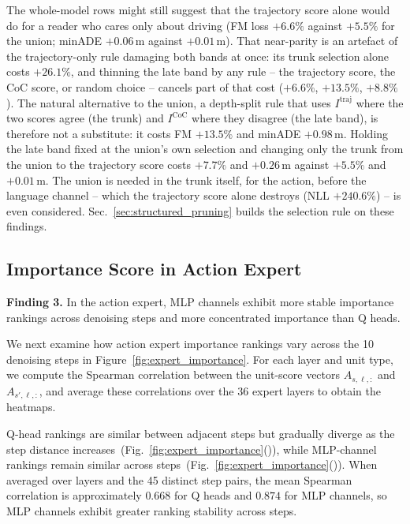 The whole-model rows might still suggest that the trajectory score alone would do for a reader who cares only about driving (FM loss $+6.6\%$ against $+5.5\%$ for the union; minADE $+0.06$\,m against $+0.01$\,m). That near-parity is an artefact of the trajectory-only rule damaging both bands at once: its trunk selection alone costs $+26.1\%$, and thinning the late band by any rule -- the trajectory score, the CoC score, or random choice -- cancels part of that cost ($+6.6\%$, $+13.5\%$, $+8.8\%$). The natural alternative to the union, a depth-split rule that uses $I^{\mathrm{traj}}$ where the two scores agree (the trunk) and $I^{\mathrm{CoC}}$ where they disagree (the late band), is therefore not a substitute: it costs FM $+13.5\%$ and minADE $+0.98$\,m. Holding the late band fixed at the union's own selection and changing only the trunk from the union to the trajectory score costs $+7.7\%$ and $+0.26$\,m against $+5.5\%$ and $+0.01$\,m. The union is needed in the trunk itself, for the action, before the language channel -- which the trajectory score alone destroys (NLL $+240.6\%$) -- is even considered.
Sec.~\ref{sec:structured_pruning} builds the selection rule on these findings.

\subsection{Importance Score in Action Expert}
\label{sec:expert_analysis}

\begin{finding}
\textbf{Finding 3.} In the action expert, MLP channels exhibit more stable importance rankings across denoising steps and more concentrated importance than Q heads.
\end{finding}



We next examine how action expert importance rankings vary across the 10 denoising steps in Figure~\ref{fig:expert_importance}.
For each layer and unit type, we compute the Spearman correlation between the unit-score vectors $A_{s,\ell,:}$ and $A_{s',\ell,:}$, and average these correlations over the 36 expert layers to obtain the heatmaps.

Q-head rankings are similar between adjacent steps but gradually diverge as the step distance increases~(Fig.~\ref{fig:expert_importance}()), while MLP-channel rankings remain similar across steps~(Fig.~\ref{fig:expert_importance}()).
When averaged over layers and the 45 distinct step pairs, the mean Spearman correlation is approximately $0.668$ for Q heads and $0.874$ for MLP channels, so MLP channels exhibit greater ranking stability across steps.

